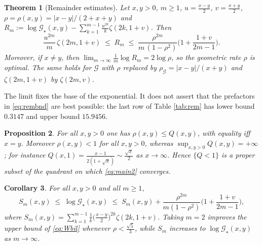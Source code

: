 \documentclass[11pt,a4paper]{amsart}
\newtheorem{theorem}{Theorem}[section]
\newtheorem{proposition}[theorem]{Proposition}
\newtheorem{corollary}[theorem]{Corollary}
\theoremstyle{definition}
\newcommand{\Gg}{\mathcal{G}}
\newcommand{\Gs}{\mathcal{G}_{\star}}
\begin{document}
\begin{theorem}[Remainder estimates]\label{thm:rem}
Let $x,y>0$, $m\ge1$, $u=\tfrac{x-y}{2}$, $v=\tfrac{x+y}{2}$,
$\rho=\rho(x,y)=|x-y|/(2+x+y)$ and
$R_m:=\log\Gs(x,y)-\sum_{k=1}^{m-1}\frac{u^{2k}}{k}\zeta(2k,1+v)$. Then
\begin{equation}\label{eq:rembnd}
  \frac{u^{2m}}{m}\,\zeta(2m,1+v)\;\le\;R_m\;\le\;
  \frac{\rho^{2m}}{m\,(1-\rho^{2})}\Big(1+\frac{1+v}{2m-1}\Big).
\end{equation}
Moreover, if $x\ne y$, then $\lim_{m\to\infty}\frac{1}{m}\log R_m=2\log\rho$, so the
geometric rate $\rho$ is optimal. The same holds for $\Gg$ with $\rho$ replaced by
$\rho_{\Gg}=|x-y|/(x+y)$ and $\zeta(2m,1+v)$ by $\zeta(2m,v)$.
\end{theorem}

The limit fixes the base of the exponential. It does not assert that the prefactors in
\eqref{eq:rembnd} are best possible: the last row of Table \ref{tab:rem} has lower bound
$0.3147$ and upper bound $15.9456$.

\begin{proposition}\label{prop:compare}
For all $x,y>0$ one has $\rho(x,y)\le Q(x,y)$, with equality iff $x=y$. Moreover
$\rho(x,y)<1$ for all $x,y>0$, whereas $\sup_{x,y>0}Q(x,y)=+\infty$; for instance
$Q(x,1)=\frac{x-1}{2(1+\sqrt x)}\sim\frac{\sqrt x}{2}$ as $x\to\infty$. Hence $\{Q<1\}$ is a
proper subset of the quadrant on which \eqref{eq:main2} converges.
\end{proposition}

\begin{corollary}\label{cor:bil}
For all $x,y>0$ and all $m\ge1$,
\[
  S_m(x,y)\;\le\;\log\Gs(x,y)\;\le\;S_m(x,y)+
  \frac{\rho^{2m}}{m(1-\rho^{2})}\Big(1+\frac{1+v}{2m-1}\Big),
\]
where $S_m(x,y)=\sum_{k=1}^{m-1}\frac{1}{k}\big(\frac{x-y}{2}\big)^{2k}\zeta(2k,1+v)$.
Taking $m=2$ improves the upper bound of \eqref{eq:Wbil} whenever
$\rho<\frac{\sqrt5}{3}$, while $S_m$ increases to $\log\Gs(x,y)$ as $m\to\infty$.
\end{corollary}
\end{document}
